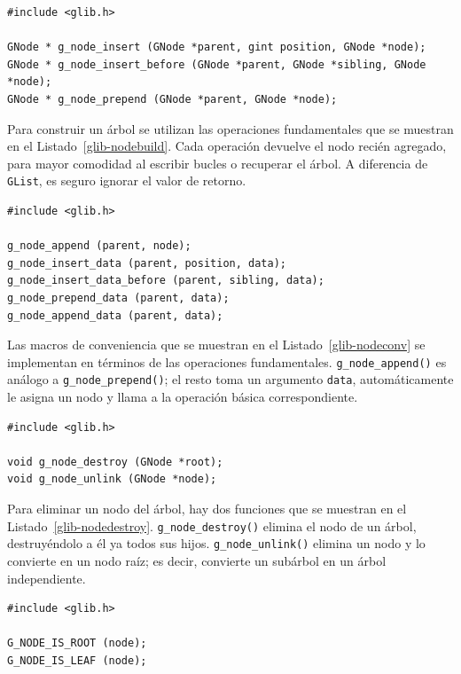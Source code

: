 \begin{lstlisting}[style=GLib/GTK, caption={Construyendo un árbol \lstinline{GNode}}, label=glib-nodebuild]
#include <glib.h>

GNode * g_node_insert (GNode *parent, gint position, GNode *node);
GNode * g_node_insert_before (GNode *parent, GNode *sibling, GNode *node);
GNode * g_node_prepend (GNode *parent, GNode *node);
\end{lstlisting}

Para construir un árbol se utilizan las operaciones fundamentales que se muestran en el Listado~\ref{glib-nodebuild}. Cada operación devuelve el nodo recién agregado, para mayor comodidad al escribir bucles o recuperar el árbol. A diferencia de \lstinline{GList}, es seguro ignorar el valor de retorno.

\begin{lstlisting}[style=GLib/GTK, caption={Construyendo un \lstinline{GNode}}, label=glib-nodeconv]
#include <glib.h>

g_node_append (parent, node);
g_node_insert_data (parent, position, data);
g_node_insert_data_before (parent, sibling, data);
g_node_prepend_data (parent, data);
g_node_append_data (parent, data);
\end{lstlisting}

Las macros de conveniencia que se muestran en el Listado~\ref{glib-nodeconv} se implementan en términos de las operaciones fundamentales. \lstinline{g_node_append()} es análogo a \lstinline{g_node_prepend()}; el resto toma un argumento \lstinline{data}, automáticamente le asigna un nodo y llama a la operación básica correspondiente.

\begin{lstlisting}[style=GLib/GTK, caption={Destruyendo un \lstinline{GNode}}, label=glib-nodedestroy]
#include <glib.h>

void g_node_destroy (GNode *root);
void g_node_unlink (GNode *node);
\end{lstlisting}

Para eliminar un nodo del árbol, hay dos funciones que se muestran en el Listado~\ref{glib-nodedestroy}. \lstinline{g_node_destroy()} elimina el nodo de un árbol, destruyéndolo a él ya todos sus hijos. \lstinline{g_node_unlink()} elimina un nodo y lo convierte en un nodo raíz; es decir, convierte un subárbol en un árbol independiente.

\begin{lstlisting}[style=GLib/GTK, caption={Predicados para \lstinline{GNode}}, label=glib-nodeextrema]
#include <glib.h>

G_NODE_IS_ROOT (node);
G_NODE_IS_LEAF (node);
\end{lstlisting}

